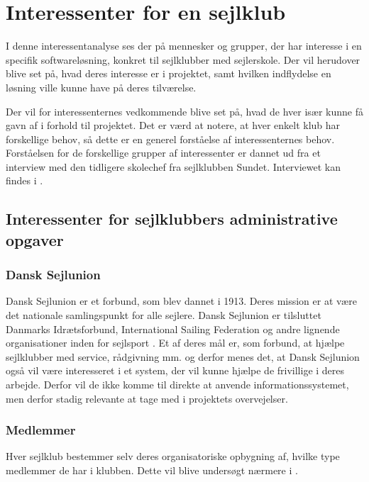 \chapter{Interessenter for en sejlklub}\label{chap:interessent-analyse-ved-sejlklubber}

I denne interessentanalyse ses der på mennesker og grupper, der har interesse i en specifik softwareløsning,
konkret til sejlklubber med sejlerskole. Der vil herudover blive set på, hvad deres interesse er i projektet,
samt hvilken indflydelse en løsning ville kunne have på deres tilværelse.

Der vil for interessenternes vedkommende blive set på, hvad de hver især kunne få gavn af i forhold til
projektet. Det er værd at notere, at hver enkelt klub har forskellige behov, så dette er en generel forståelse
af interessenternes behov. Forståelsen for de forskellige grupper af interessenter er dannet ud fra et
interview med den tidligere skolechef fra sejlklubben Sundet. Interviewet kan findes i
.


\section{Interessenter for sejlklubbers administrative opgaver}


\subsection{Dansk Sejlunion}

Dansk Sejlunion er et forbund, som blev dannet i 1913. Deres mission er at være det nationale samlingspunkt for alle
sejlere. Dansk Sejlunion er tilsluttet Danmarks Idrætsforbund, International Sailing Federation og andre lignende
organisationer inden for sejlsport \citep{Sejlsportdk}.
Et af deres mål er, som forbund, at hjælpe sejlklubber med service, rådgivning mm. og derfor menes det, at Dansk
Sejlunion også vil være interesseret i
et system, der vil kunne hjælpe de frivillige i deres arbejde. Derfor vil de ikke komme til direkte at anvende
informationssystemet, men derfor stadig relevante at tage med i projektets overvejelser.


\subsection{Medlemmer}

Hver sejlklub bestemmer selv deres organisatoriske opbygning af, hvilke type medlemmer de har i klubben.
Dette vil blive undersøgt nærmere i . 

